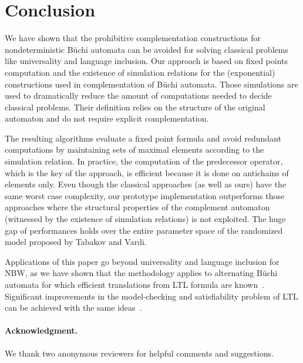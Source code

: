 \documentclass{LMCS}
\begin{document}
\section{Conclusion}\label{sec:conclusion}

We have shown that the prohibitive complementation constructions
for nondeterministic B\"uchi automata can be avoided for solving 
classical problems like universality and language inclusion. 
Our approach is based on fixed points computation and the existence of simulation relations 
for the (exponential) constructions used in complementation of 
B\"uchi automata. Those simulations are used to dramatically 
reduce the amount of computations needed to decide classical problems.
Their definition relies on the structure of the original automaton
and do not require explicit complementation. 

The resulting algorithms evaluate a fixed point formula and avoid
redundant computations by maintaining sets of maximal elements
according to the simulation relation. In practice, the computation of
the predecessor operator, which is the key of the approach, is
efficient because it is done on antichains of elements only. Even though
the classical approaches (as well as ours) have the same worst case
complexity, our prototype implementation outperforms those approaches
where the structural properties of the complement automaton (witnessed by the 
existence of simulation relations) is not exploited. The huge gap of performances holds
over the entire parameter space of the randomized model proposed by
Tabakov and Vardi.

Applications of this paper go beyond universality and language inclusion 
for NBW, as we have shown that the methodology applies to alternating 
B\"uchi automata for which efficient translations from LTL formula are 
known~\cite{GastinOddoux}. Significant improvements in the model-checking 
and satisfiability problem of LTL can be achieved with the same ideas~\cite{DDMR08a,DDMR08c}.


\paragraph{{\bf Acknowledgment.}} We thank two anonymous reviewers for helpful 
comments and suggestions.






\end{document}
